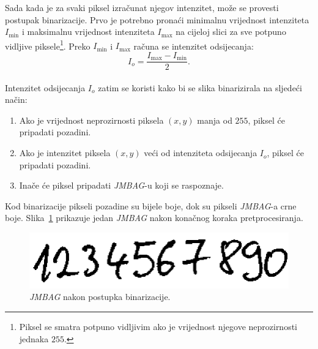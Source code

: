 \newpage
\noindent
Sada kada je za svaki piksel izračunat njegov intenzitet, može se provesti postupak binarizacije. Prvo je potrebno
pronaći minimalnu vrijednost intenziteta $I_{\min}$ i maksimalnu vrijednost intenziteta $I_{\max}$ na cijeloj slici za
sve potpuno vidljive piksele\footnote{Piksel se smatra potpuno vidljivim ako je vrijednost njegove neprozirnosti
jednaka $255$.}. Preko $I_{\min}$ i $I_{\max}$ računa se intenzitet odsijecanja:\\
\begin{equation}
    I_{o} = \frac{I_{\max} - I_{\min}}{2}.\label{eq:cutoff-intensity}
\end{equation}\\
Intenzitet odsijecanja $I_{o}$ zatim se koristi kako bi se slika binarizirala na sljedeći način:
\begin{enumerate}
    \item Ako je vrijednost neprozirnosti piksela $(x, y)$ manja od $255$, piksel će pripadati pozadini.
    \item Ako je intenzitet piksela $(x, y)$ veći od intenziteta odsijecanja $I_{o}$, piksel će pripadati pozadini.
    \item Inače će piksel pripadati \emph{JMBAG}-u koji se raspoznaje.
\end{enumerate}
Kod binarizacije pikseli pozadine su bijele boje, dok su pikseli \emph{JMBAG}-a crne boje.
Slika\ \ref{fig:preprocessing-binarized-image} prikazuje jedan \emph{JMBAG} nakon konačnog koraka pretprocesiranja.
\begin{figure}[htb]
    \centering
    \includegraphics[width=12cm]{images/chapter4/preprocessing-binarized-image.png}
    \caption{\emph{JMBAG} nakon postupka binarizacije.}
    \label{fig:preprocessing-binarized-image}
\end{figure}
\newpage


